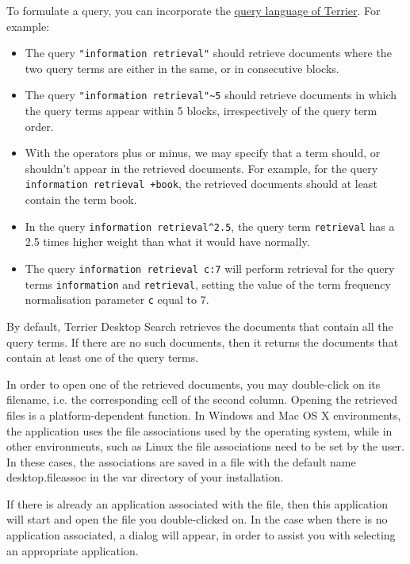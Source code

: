 To formulate a query, you can incorporate the
\href{querylanguage.html}{query language of Terrier}. For example:

\begin{itemize}
\tightlist
\item
  The query \texttt{"information\ retrieval"} should retrieve documents
  where the two query terms are either in the same, or in consecutive
  blocks.
\item
  The query \texttt{"information\ retrieval"\textasciitilde{}5} should
  retrieve documents in which the query terms appear within 5 blocks,
  irrespectively of the query term order.
\item
  With the operators plus or minus, we may specify that a term should,
  or shouldn't appear in the retrieved documents. For example, for the
  query \texttt{information\ retrieval\ +book}, the retrieved documents
  should at least contain the term book.
\item
  In the query \texttt{information\ retrieval\^{}2.5}, the query term
  \texttt{retrieval} has a 2.5 times higher weight than what it would
  have normally.
\item
  The query \texttt{information\ retrieval\ c:7} will perform retrieval
  for the query terms \texttt{information} and \texttt{retrieval},
  setting the value of the term frequency normalisation parameter
  \texttt{c} equal to 7.
\end{itemize}

By default, Terrier Desktop Search retrieves the documents that contain
all the query terms. If there are no such documents, then it returns the
documents that contain at least one of the query terms.

In order to open one of the retrieved documents, you may double-click on
its filename, i.e. the corresponding cell of the second column. Opening
the retrieved files is a platform-dependent function. In Windows and Mac
OS X environments, the application uses the file associations used by
the operating system, while in other environments, such as Linux the
file associations need to be set by the user. In these cases, the
associations are saved in a file with the default name desktop.fileassoc
in the var directory of your installation.

If there is already an application associated with the file, then this
application will start and open the file you double-clicked on. In the
case when there is no application associated, a dialog will appear, in
order to assist you with selecting an appropriate application.

